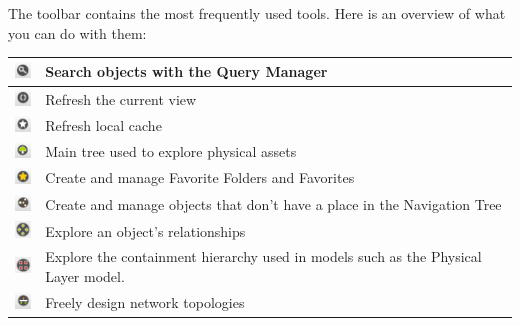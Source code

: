 \documentclass[a4paper]{article}
\begin{document}
	The toolbar contains the most frequently used tools. Here is an overview of what you can do with them:
	\begin{table}[h!]
		\centering
		\begin{tabular}{cl}
			\includegraphics[width=0.5cm]{img/icon_query_manager.png} & Search objects with the Query Manager\\
			\midrule
			\includegraphics[width=0.5cm]{img/icon_refresh_component.png} & Refresh the current view\\
			\midrule
			\includegraphics[width=0.5cm]{img/icon_refresh_cache.png} & Refresh local cache\\
			\midrule
			\includegraphics[width=0.5cm]{img/icon_navigation_tree.png} & Main tree used to explore physical assets\\
			\midrule
			\includegraphics[width=0.5cm]{img/icon_bookmarks.png} & Create and manage Favorite Folders and Favorites\\
			\midrule
			\includegraphics[width=0.5cm]{img/icon_pools_manager.png} & Create and manage objects that don't have a place in the Navigation Tree\\
			\midrule
			\includegraphics[width=0.5cm]{img/icon_relationship_explorer.png} & Explore an object's relationships\\
			\midrule
			\includegraphics[width=0.5cm]{img/icon_special_children_explorer.png} & Explore the containment hierarchy used in models such as the Physical Layer model.\\
			\midrule
			\includegraphics[width=0.5cm]{img/icon_topology_designer.png} & Freely design network topologies\\

\end{tabular}
\end{table}
\end{document}
